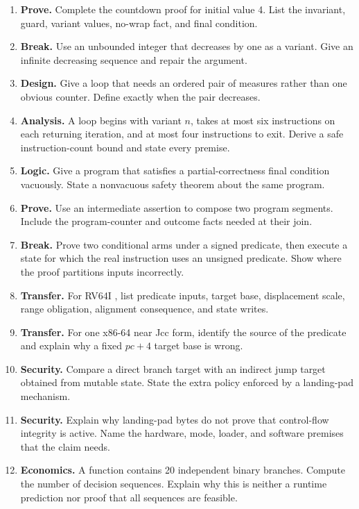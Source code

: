 \begin{enumerate}
smallest bound and program that expose the extra transition.
\item \textbf{Prove.} Complete the countdown proof for initial value 4. List
the invariant, guard, variant values, no-wrap fact, and final condition.
\item \textbf{Break.} Use an unbounded integer that decreases by one as a
variant. Give an infinite decreasing sequence and repair the argument.
\item \textbf{Design.} Give a loop that needs an ordered pair of measures
rather than one obvious counter. Define exactly when the pair decreases.
\item \textbf{Analysis.} A loop begins with variant \(n\), takes at most six
instructions on each returning iteration, and at most four instructions to
exit. Derive a safe instruction-count bound and state every premise.
\item \textbf{Logic.} Give a program that satisfies a partial-correctness
final condition vacuously. State a nonvacuous safety theorem about the same
program.
\item \textbf{Prove.} Use an intermediate assertion to compose two program
segments. Include the program-counter and outcome facts needed at their join.
\item \textbf{Break.} Prove two conditional arms under a signed predicate,
then execute a state for which the real instruction uses an unsigned predicate.
Show where the proof partitions inputs incorrectly.
\item \textbf{Transfer.} For RV64I , list predicate inputs, target
base, displacement scale, range obligation, alignment consequence, and state
writes.
\item \textbf{Transfer.} For one x86-64 near Jcc form, identify the source of
the predicate and explain why a fixed \(pc+4\) target base is wrong.
\item \textbf{Security.} Compare a direct branch target with an indirect jump
target obtained from mutable state. State the extra policy enforced by a
landing-pad mechanism.
\item \textbf{Security.} Explain why landing-pad bytes do not prove that
control-flow integrity is active. Name the hardware, mode, loader, and software
premises that the claim needs.
\item \textbf{Economics.} A function contains 20 independent binary branches.
Compute the number of decision sequences. Explain why this is neither a
runtime prediction nor proof that all sequences are feasible.

\end{enumerate}
